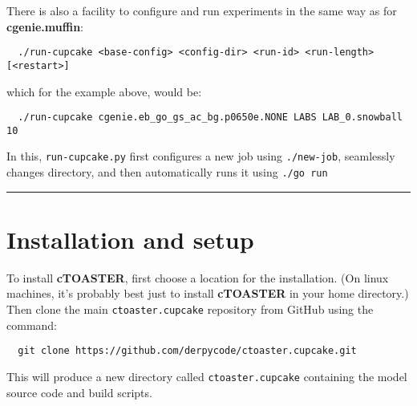 \documentclass[a4paper,10pt,article]{memoir}
\begin{document}
There is also a facility to configure and run experiments in the same way as for \textbf{cgenie.muffin}:
\begin{verbatim}
  ./run-cupcake <base-config> <config-dir> <run-id> <run-length> [<restart>]
\end{verbatim}
which for the example above, would be:
\begin{verbatim}
  ./run-cupcake cgenie.eb_go_gs_ac_bg.p0650e.NONE LABS LAB_0.snowball 10
\end{verbatim}
In this, \texttt{run-cupcake.py} first configures a new job using \texttt{./new-job},
seamlessly changes directory, and then automatically runs it using \texttt{./go run}

\vspace{1mm}\noindent\rule{4cm}{0.5pt}\vspace{2mm}

\newpage

\section{Installation and setup}

To install \textbf{cTOASTER}, first choose a location for the installation. (On linux machines, it's probably best just to install \textbf{cTOASTER} in your home directory.) Then clone the main \texttt{ctoaster.cupcake} repository from GitHub
using the command:
\begin{verbatim}
  git clone https://github.com/derpycode/ctoaster.cupcake.git
\end{verbatim}
This will produce a new directory called \texttt{ctoaster.cupcake} containing the model source code and build scripts.
\end{document}
